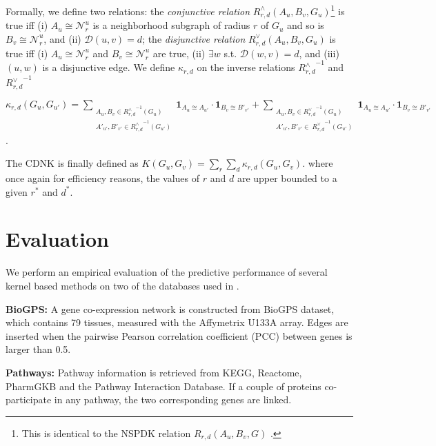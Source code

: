 \documentclass{esannV2}
\begin{document}
Formally, we define two relations: the \textit{conjunctive relation} $R^{\wedge}_{r,d}(A_u, B_v, G_u)$\footnote{This is identical to the NSPDK relation $R_{r,d}(A_u, B_v, G)$ .}  is true iff (i) $A_u \cong \mathcal{N}_r^u$ is a neighborhood subgraph of radius $r$ of $G_u$ and so is $B_v \cong \mathcal{N}_r^u$,  and (ii) $\mathcal{D}(u,v)= d$; the \textit{disjunctive relation} $R_{r,d}^{\vee}(A_u, B_v, G_u)$ is true iff (i)  $A_u \cong \mathcal{N}_r^u$ and $B_v \cong \mathcal{N}_r^u$ are true, (ii) $\exists w$ s.t. $\mathcal{D}(w,v)= d$, and (iii) $(u,w)$ is a disjunctive edge. We define $\kappa_{r,d}$ on the  inverse relations ${R^{\wedge}_{r,d}}^{ -1}$ and ${R^{\vee}_{r,d}}^{ -1}$
\begin{center}
 $\kappa_{r,d}(G_u,G_{u'}) = \!\!\!\!\!\!\!\!\!\!\!\!
 \sum\limits_{\substack {A_u,{B}_{v} \in {R_{r,d}^{\wedge}}^{ -1}(G_u) \\ A'_{u'},{B'}_{v'} \in {R_{r,d}^{\wedge}}^{ -1}(G_{u'}) }} \!\!\!\!\!\!\!\!\!\!\!\!
  { \textbf{1}_{A_u \cong A_{u'}} \cdot { \textbf{1}_{B_{v} \cong B'_{v'}}}}
+ \!\!\!\!\!\!\!\!\!\!\!\!
 \sum\limits_{\substack {A_u,{B}_{v} \in {R_{r,d}^{\vee}}^{ -1}(G_u) \\
  A'_{u'},{B'}_{v'} \in \ {R_{r,d}^{\vee}}^{ -1}(G_{u'}) }} \!\!\!\!\!\!\!\!\!\!\!\!
  { \textbf{1}_{A_u \cong A_{u'}} \cdot { \textbf{1}_{B_{v} \cong B'_{v'}}}}
  $.
\end{center}
The CDNK is finally defined as $K(G_u,G_v) = \sum\limits_{r}{\sum\limits_{d}{\kappa_{r,d}(G_u,G_v)}}.$ where once again for efficiency reasons, the values of $r$ and $d$ are upper bounded to a given $r^*$ and $d^*$.
\section{Evaluation}
\label{evaluation}
We perform an empirical evaluation of the predictive performance of several kernel based methods on two of the databases used in \cite{medk}.

\textbf{BioGPS:} A gene co-expression network is constructed from BioGPS dataset, which contains 79 tissues, measured with the Affymetrix U133A array. Edges are inserted when the pairwise Pearson correlation coefficient (PCC) between genes is larger than 0.5.

\textbf{Pathways:} Pathway information is retrieved from KEGG, Reactome, PharmGKB and the Pathway Interaction Database. If a couple of proteins co-participate in any pathway, the two corresponding genes are linked.  
\end{document}
